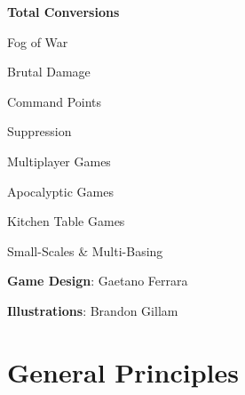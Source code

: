 \documentclass[9pt, a4paper]{extarticle}            %
\begin{document}
\begin{multicols}{2}
\textbf{Total Conversions} 

\hspace{1cm}Fog of War 

\hspace{1cm}Brutal Damage 

\hspace{1cm}Command Points 

\hspace{1cm}Suppression 

\hspace{1cm}Multiplayer Games 

\hspace{1cm}Apocalyptic Games 

\hspace{1cm}Kitchen Table Games 

\hspace{1cm}Small-Scales \& Multi-Basing 

\end{multicols}

\vfill
\textbf{Game Design}: Gaetano Ferrara

\textbf{Illustrations}: Brandon Gillam

\newpage



\section{General Principles}
\end{document}

